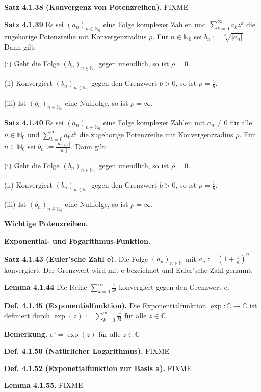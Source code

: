 \documentclass[ngerman]{article}
\begin{document}
\begin{multicols}{4}
\begin{tiny}
\textbf{Satz 4.1.38 (Konvergenz von Potenzreihen).} FIXME

\textbf{Satz 4.1.39} Es sei $(a_n)_{n \in \mathbb N_0}$ eine Folge komplexer Zahlen und $\sum_{k=0}^\infty a_k z^k$ die zugehörige Potenzreihe mit Konvergenzradius $\rho$. Für $n \in \mathbb N_0$ sei $b_n := \sqrt[n]{\vert a_n \vert}$. Dann gilt:

(i) Geht die Folge $(b_n)_{n \in \mathbb N_0}$ gegen unendlich, so ist $\rho = 0$.

(ii) Konvergiert $(b_n)_{n \in \mathbb N_0}$ gegen den Grenzwert $b > 0$, so ist $\rho = \frac{1}{b}$.

(iii) Ist $(b_n)_{n \in \mathbb N_0}$ eine Nullfolge, so ist $\rho = \infty$.

\textbf{Satz 4.1.40} Es sei $(a_n)_{n \in \mathbb N_0}$ eine Folge komplexer Zahlen mit $a_n \neq 0$ für alle $n \in \mathbb N_0$ und $\sum_{k=0}^\infty a_k z^k$ die zugehörige Potenzreihe mit Konvergenzradius $\rho$. Für $n \in \mathbb N_0$ sei $b_n := \frac{\vert a_{n+1} \vert }{\vert a_n \vert}$. Dann gilt:

(i) Geht die Folge $(b_n)_{n \in \mathbb N_0}$ gegen unendlich, so ist $\rho = 0$.

(ii) Konvergiert $(b_n)_{n \in \mathbb N_0}$ gegen den Grenzwert $b > 0$, so ist $\rho = \frac{1}{b}$.

(iii) Ist $(b_n)_{n \in \mathbb N_0}$ eine Nullfolge, so ist $\rho = \infty$.

\textbf{Wichtige Potenzreihen.}

\textbf{Exponential- und Fogarithmus-Funktion.}

\textbf{Satz 4.1.43 (Euler’sche Zahl e).} Die Folge $(a_n)_{n \in \mathbb N}$ mit $a_n := (1+\frac{1}{n})^n$ konvergiert. Der Grenzwert wird mit e bezeichnet und Euler’sche Zahl genannt.

\textbf{Lemma 4.1.44} Die Reihe $\sum_{k=0}^\infty \frac{1}{k!}$ konvergiert gegen den Grenzwert e.

\textbf{Def. 4.1.45 (Exponentialfunktion).} Die Exponentialfunktion $\exp : \mathbb C \rightarrow \mathbb C$ ist definiert durch $\exp (z) :=  \sum_{k=0}^\infty \frac{z^k}{k!}$ für alle $z \in \mathbb C$.

\textbf{Bemerkung.} $e^z = \exp (z)$ für alle $z \in \mathbb C$

\textbf{Def. 4.1.50 (Natürlicher Logarithmus).} FIXME

\textbf{Def. 4.1.52 (Exponetialfunktion zur Basis a).} FIXME

\textbf{Lemma 4.1.55.} FIXME


\end{tiny}
\end{multicols}
\end{document}
